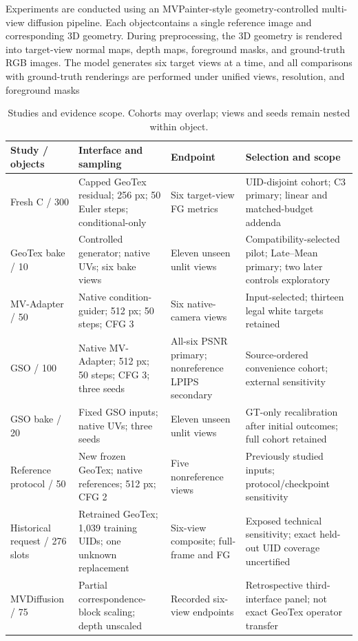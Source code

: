 \documentclass[times,twocolumn,final]{elsarticle}
\providecommand{\DIFdel}[1]{{\protect\color{red} \scriptsize #1}} %
\providecommand{\DIFaddbegin}{} %
\providecommand{\DIFdelbegin}{} %
\providecommand{\DIFdelend}{} %
\begin{document}
\DIFdelbegin \DIFdel{Experiments are conducted using an MVPainter-style geometry-controlled multi-view diffusion pipeline. Each objectcontains a single reference image and corresponding 3D geometry. During preprocessing, the 3D geometry is rendered into target-view normal maps, depth maps, foreground masks, and ground-truth RGB images. The model generates six target views at a time, and all comparisons with ground-truth renderings are performed under unified views, resolution, and foreground masks}\DIFdelend \DIFaddbegin \begin{table}[t]
\centering\footnotesize\setlength{\tabcolsep}{3.5pt}\renewcommand{\arraystretch}{1.08}
\caption{Studies and evidence scope. Cohorts may overlap; views and seeds remain nested within object.}
\label{tab:study-design}
\begin{tabular}{p{}p{}p{}p{}}
\toprule Study / objects & Interface and sampling & Endpoint & Selection and scope \\
\midrule
Fresh C / 300 & Capped GeoTex residual; 256 px; 50 Euler steps; conditional-only & Six target-view FG metrics & UID-disjoint cohort; C3 primary; linear and matched-budget addenda \\
GeoTex bake / 10 & Controlled generator; native UVs; six bake views & Eleven unseen unlit views & Compatibility-selected pilot; Late--Mean primary; two later controls exploratory \\
MV-Adapter / 50 & Native condition-guider; 512 px; 50 steps; CFG 3 & Six native-camera views & Input-selected; thirteen legal white targets retained \\
GSO / 100 & Native MV-Adapter; 512 px; 50 steps; CFG 3; three seeds & All-six PSNR primary; nonreference LPIPS secondary & Source-ordered convenience cohort; external sensitivity \\
GSO bake / 20 & Fixed GSO inputs; native UVs; three seeds & Eleven unseen unlit views & GT-only recalibration after initial outcomes; full cohort retained \\
Reference protocol / 50 & New frozen GeoTex; native references; 512 px; CFG 2 & Five nonreference views & Previously studied inputs; protocol/checkpoint sensitivity \\
Historical request / 276 slots & Retrained GeoTex; 1,039 training UIDs; one unknown replacement & Six-view composite; full-frame and FG & Exposed technical sensitivity; exact held-out UID coverage uncertified \\
MVDiffusion / 75 & Partial correspondence-block scaling; depth unscaled & Recorded six-view endpoints & Retrospective third-interface panel; not exact GeoTex operator transfer \\
\bottomrule
\end{tabular}
\end{table}
\end{document}
